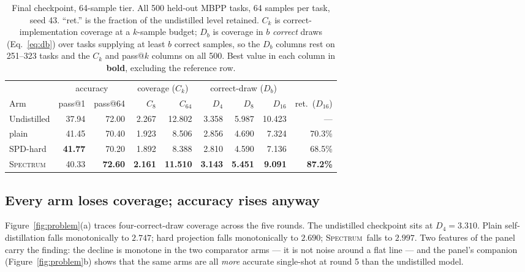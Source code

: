 \documentclass{article}
\newcommand{\method}{\textsc{Spectrum}}
\begin{document}
\begin{table}[t]
\caption{\small Final checkpoint, 64-sample tier. All 500 held-out MBPP tasks, 64 samples per task, seed 43. ``ret.'' is the fraction of the undistilled level retained. $C_k$ is correct-implementation coverage at a $k$-sample budget; $D_b$ is coverage in $b$ \emph{correct} draws (Eq.~\eqref{eq:db}) over tasks supplying at least $b$ correct samples, so the $D_b$ columns rest on 251--323 tasks and the $C_k$ and pass@$k$ columns on all 500. Best value in each column in \textbf{bold}, excluding the reference row.}
\label{tab:main}
\centering\small
\begin{tabular}{lrrrrrrrr}
\toprule
 & \multicolumn{2}{c}{accuracy} & \multicolumn{2}{c}{coverage ($C_k$)} & \multicolumn{3}{c}{correct-draw ($D_b$)} & \\
\cmidrule(lr){2-3}\cmidrule(lr){4-5}\cmidrule(lr){6-8}
Arm & pass@1 & pass@64 & $C_{8}$ & $C_{64}$ & $D_{4}$ & $D_{8}$ & $D_{16}$ & ret.\ ($D_{16}$) \\
\midrule
Undistilled & 37.94 & 72.00 & 2.267 & 12.802 & 3.358 & 5.987 & 10.423 & --- \\
\midrule
plain       & 41.45 & 70.40 & 1.923 & 8.506 & 2.856 & 4.690 & 7.324 & 70.3\% \\
SPD-hard    & \textbf{41.77} & 70.20 & 1.892 & 8.388 & 2.810 & 4.590 & 7.136 & 68.5\% \\
\method     & 40.33 & \textbf{72.60} & \textbf{2.161} & \textbf{11.510} & \textbf{3.143} & \textbf{5.451} & \textbf{9.091} & \textbf{87.2\%} \\
\bottomrule
\end{tabular}
\end{table}

\subsection{Every arm loses coverage; accuracy rises anyway}
\label{sec:erosion}

Figure~\ref{fig:problem}(a) traces four-correct-draw coverage across the five rounds. The undistilled checkpoint sits at $D_4 = 3.310$. Plain self-distillation falls monotonically to $2.747$; hard projection falls monotonically to $2.690$; \method\ falls to $2.997$. Two features of the panel carry the finding: the decline is monotone in the two comparator arms --- it is not noise around a flat line --- and the panel's companion (Figure~\ref{fig:problem}b) shows that the same arms are all \emph{more} accurate single-shot at round 5 than the undistilled model.
\end{document}
